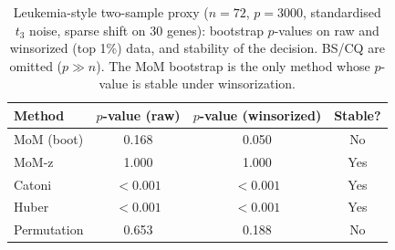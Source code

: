 \begin{table}[t]
\centering\small
\caption{Leukemia-style two-sample proxy ($n=72$, $p=3000$, standardised $t_3$ noise, sparse shift on 30 genes): bootstrap $p$-values on raw and winsorized (top 1\%) data, and stability of the decision. BS/CQ are omitted ($p\gg n$). The MoM bootstrap is the only method whose $p$-value is stable under winsorization.}
\label{tab:real}
\begin{tabular}{lccc}
\toprule
Method & $p$-value (raw) & $p$-value (winsorized) & Stable? \\
\midrule
MoM (boot) & 0.168 & 0.050 & No \\
MoM-z & 1.000 & 1.000 & Yes \\
Catoni & $<0.001$ & $<0.001$ & Yes \\
Huber & $<0.001$ & $<0.001$ & Yes \\
Permutation & 0.653 & 0.188 & No \\
\bottomrule
\end{tabular}
\end{table}